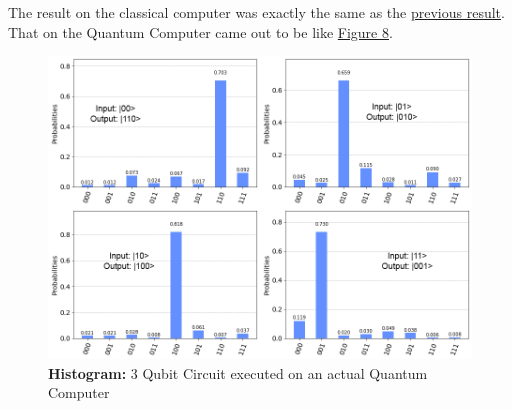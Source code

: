 The result on the classical computer was exactly the same as the \hyperref[fig:5qubit_act]{previous result}. That on the Quantum Computer came out to be like \hyperref[fig:3qubit_act]{Figure 8}.

\begin{figure}[h]%
	\centering
	\includegraphics[width=\linewidth]{./images/3qubit_act.png}
	\caption{\textbf{Histogram:} 3 Qubit Circuit executed on an actual Quantum Computer}%
	\label{fig:3qubit_act}%
\end{figure}

